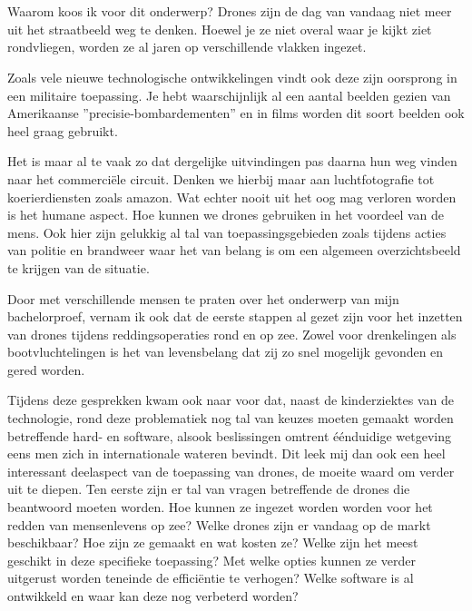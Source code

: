 
\chapter*{}
\label{ch:voorwoord}

Waarom koos ik voor dit onderwerp? Drones zijn de dag van vandaag niet meer uit het straatbeeld weg te denken. Hoewel je ze niet overal waar je kijkt ziet rondvliegen, worden ze al jaren op verschillende vlakken ingezet.

Zoals vele nieuwe technologische ontwikkelingen vindt ook deze zijn oorsprong in een militaire toepassing. Je hebt waarschijnlijk al een aantal beelden gezien van Amerikaanse ''precisie-bombardementen'' en in films worden dit soort beelden ook heel graag gebruikt.

Het is maar al te vaak zo dat dergelijke uitvindingen pas daarna hun weg vinden naar het commerciële circuit. Denken we hierbij maar aan luchtfotografie tot koerierdiensten zoals amazon. Wat echter nooit uit het oog mag verloren worden is het humane aspect. Hoe kunnen we drones gebruiken in het voordeel van de mens. Ook hier zijn gelukkig al tal van toepassingsgebieden zoals tijdens acties van politie en brandweer waar het van belang is om een algemeen overzichtsbeeld te krijgen van de situatie.

Door met verschillende mensen te praten over het onderwerp van mijn bachelorproef, vernam ik ook dat de eerste stappen al gezet zijn voor het inzetten van drones tijdens reddingsoperaties rond en op zee. Zowel voor drenkelingen als bootvluchtelingen is het van levensbelang dat zij zo snel mogelijk gevonden en gered worden. 

Tijdens deze gesprekken kwam ook naar voor dat, naast de kinderziektes van de technologie, rond deze problematiek nog tal van keuzes moeten gemaakt worden betreffende hard- en software, alsook beslissingen omtrent éénduidige wetgeving eens men zich in internationale wateren bevindt. 
Dit leek mij dan ook een heel interessant deelaspect van de toepassing van drones, de moeite waard om verder uit te diepen. 
\newpage
Ten eerste zijn er tal van vragen betreffende de drones die beantwoord moeten worden. Hoe kunnen ze ingezet worden worden voor het redden van mensenlevens op zee? Welke drones zijn er vandaag op de markt beschikbaar? Hoe zijn ze gemaakt en wat kosten ze? Welke zijn het meest geschikt in deze specifieke toepassing? Met welke opties kunnen ze verder uitgerust worden teneinde de efficiëntie te verhogen? Welke software is al ontwikkeld en waar kan deze nog verbeterd worden? 

